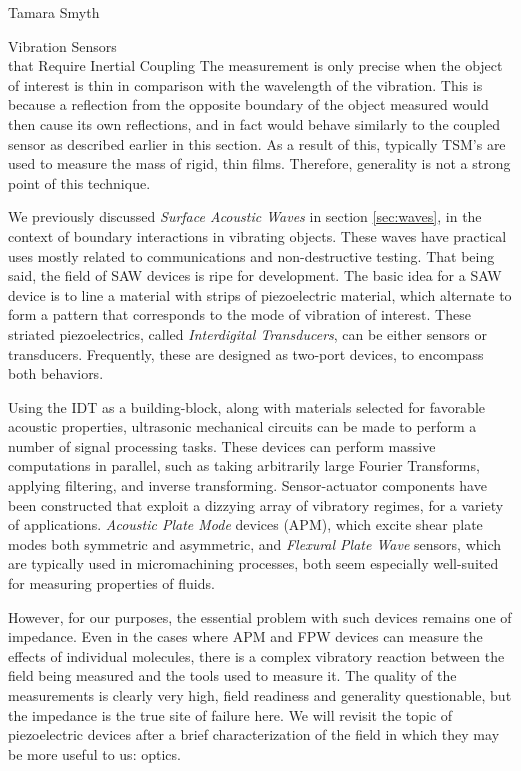 \documentclass[a4paper,10pt]{report}
\numberwithin{equation}{section}
\begin{document}
\begin{chapter}{Tamara Smyth}
\begin{section}{Vibration Sensors \\that Require Inertial Coupling}
The measurement is only precise when the object of interest is thin in comparison with the wavelength of the vibration. This is because a reflection from the opposite boundary of the object measured would then cause its own reflections, and in fact would behave similarly to the coupled sensor as described earlier in this section. As a result of this, typically TSM's are used to measure the mass of rigid, thin films. Therefore, generality is not a strong point of this technique. 

We previously discussed \emph{Surface Acoustic Waves} in section \ref{sec:waves}, in the context of boundary interactions in vibrating objects. These waves have practical uses mostly related to communications and non-destructive testing. That being said, the field of SAW devices is ripe for development. The basic idea for a SAW device is to line a material with strips of piezoelectric material, which alternate to form a pattern that corresponds to the mode of vibration of interest. These striated piezoelectrics, called \emph{Interdigital Transducers}, can be either sensors or transducers. Frequently, these are designed as two-port devices, to encompass both behaviors. \cite[p.~36]{Ballantine1997}

Using the IDT as a building-block, along with materials selected for favorable acoustic properties, ultrasonic mechanical circuits can be made to perform a number of signal processing tasks. \cite[p.~318]{Kino1987} These devices can perform massive computations in parallel, such as taking arbitrarily large Fourier Transforms, applying filtering, and inverse transforming. \cite[p.~391]{Kino1987} Sensor-actuator components have been constructed that exploit a dizzying array of vibratory regimes, for a variety of applications. \emph{Acoustic Plate Mode} devices (APM), which excite shear plate modes both symmetric and asymmetric, and \emph{Flexural Plate Wave} sensors, which are typically used in micromachining processes, both seem especially well-suited for measuring properties of fluids.\cite[p.~106]{Ballantine1997}\cite[p.115]{Ballantine1997}

However, for our purposes, the essential problem with such devices remains one of impedance. Even in the cases where APM and FPW devices can measure the effects of individual molecules, there is a complex vibratory reaction between the field being measured and the tools used to measure it. \cite[p.~120]{Ballantine1997} The quality of the measurements is clearly very high, field readiness and generality questionable, but the impedance is the true site of failure here. We will revisit the topic of piezoelectric devices after a brief characterization of the field in which they may be more useful to us: optics.


\end{section}
\end{chapter}
\end{document}
